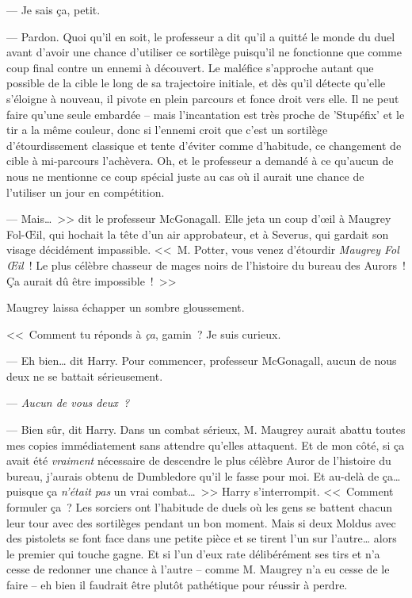 --- Je sais ça, petit.

--- Pardon. Quoi qu'il en soit, le professeur a dit qu'il a quitté le monde du duel avant d'avoir une chance d'utiliser ce sortilège puisqu'il ne fonctionne que comme coup final contre un ennemi à découvert. Le maléfice s'approche autant que possible de la cible le long de sa trajectoire initiale, et dès qu'il détecte qu'elle s'éloigne à nouveau, il pivote en plein parcours et fonce droit vers elle. Il ne peut faire qu'une seule embardée -- mais l'incantation est très proche de 'Stupéfix' et le tir a la même couleur, donc si l'ennemi croit que c'est un sortilège d'étourdissement classique et tente d'éviter comme d'habitude, ce changement de cible à mi-parcours l'achèvera. Oh, et le professeur a demandé à ce qu'aucun de nous ne mentionne ce coup spécial juste au cas où il aurait une chance de l'utiliser un jour en compétition.

--- Mais…~>> dit le professeur McGonagall. Elle jeta un coup d'œil à Maugrey Fol-Œil, qui hochait la tête d'un air approbateur, et à Severus, qui gardait son visage décidément impassible. <<~M. Potter, vous venez d'étourdir \emph{Maugrey Fol Œil}~! Le plus célèbre chasseur de mages noirs de l'histoire du bureau des Aurors~! Ça aurait dû être impossible~!~>>

Maugrey laissa échapper un sombre gloussement.

<<~Comment tu réponds à \emph{ça}, gamin~? Je suis curieux.

--- Eh bien… dit Harry. Pour commencer, professeur McGonagall, aucun de nous deux ne se battait sérieusement.

--- \emph{Aucun de vous deux~?}

--- Bien sûr, dit Harry. Dans un combat sérieux, M. Maugrey aurait abattu toutes mes copies immédiatement sans attendre qu'elles attaquent. Et de mon côté, si ça avait été \emph{vraiment} nécessaire de descendre le plus célèbre Auror de l'histoire du bureau, j'aurais obtenu de Dumbledore qu'il le fasse pour moi. Et au-delà de ça… puisque ça \emph{n'était pas} un vrai combat…~>> Harry s'interrompit. <<~Comment formuler ça~? Les sorciers ont l'habitude de duels où les gens se battent chacun leur tour avec des sortilèges pendant un bon moment. Mais si deux Moldus avec des pistolets se font face dans une petite pièce et se tirent l'un sur l'autre… alors le premier qui touche gagne. Et si l'un d'eux rate délibérément ses tirs et n'a cesse de redonner une chance à l'autre -- comme M. Maugrey n'a eu cesse de le faire -- eh bien il faudrait être plutôt pathétique pour réussir à perdre.

